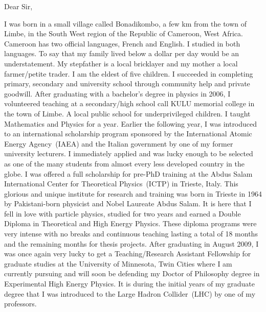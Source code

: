 \documentclass[12pt]{article}
\date{\today}
\begin{document}
Dear Sir,

\par
I was born in a small village called Bonadikombo, a few km from the town of Limbe, in the South West region of the Republic of Cameroon, West Africa. Cameroon has two official languages, French and English. I studied in both languages. To say that my family lived below a dollar per day would be an understatement.
My stepfather is a local bricklayer and my mother a local farmer/petite trader.
I am the eldest of five children. I succeeded in completing primary, secondary  and university school through community help and private goodwill. After graduating with a bachelor's degree in physics in 2006, I volunteered teaching  at a secondary/high school call KULU memorial college in the town of Limbe. A local public school for underprivileged children.
I taught Mathematics and Physics for a year. Earlier the following year, I was introduced to an international scholarship program sponsored by the International Atomic Energy Agency~(IAEA) and the Italian government by one of my former university lecturers. I immediately applied and was lucky enough to be selected as one of the many students from almost every less developed country in the globe. I was offered a full scholarship for pre-PhD training at the Abdus Salam International Center for Theoretical Physics~(ICTP) in Trieste, Italy. This glorious and unique institute for research and training was born in Trieste in 1964 by Pakistani-born physicist and Nobel Laureate Abdus Salam.
It is here that I fell in love with particle physics, studied for two years and earned a Double Diploma in Theoretical and High Energy Physics. These diploma programs were very intense with no breaks and continuous teaching lasting a total of 18 months and the remaining months for thesis projects. After graduating in August 2009, I was once again very lucky to get a Teaching/Research Assistant Fellowship for graduate studies at the University of Minnesota, Twin Cities where I am currently pursuing and will soon be defending my Doctor of Philosophy degree in Experimental High Energy Physics. It is during the initial years of my graduate degree that I was introduced to the Large Hadron Collider~(LHC) by one of my professors.
\end{document}
